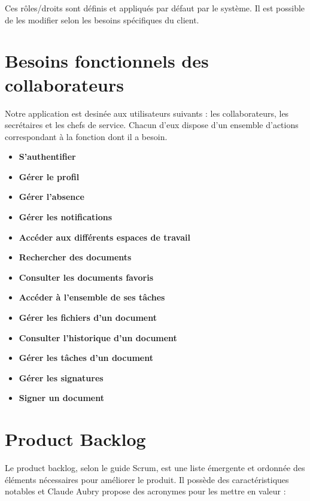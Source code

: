 \begin{small}
  Ces rôles/droits sont définis et appliqués par défaut par le système. Il est possible de les modifier selon les besoins spécifiques du client.
\end{small}


\section{Besoins fonctionnels des collaborateurs}
Notre application est desinée aux utilisateurs suivants : les collaborateurs, les secrétaires et les chefs de service. Chacun d'eux dispose d'un ensemble d'actions correspondant à la fonction dont il a besoin.

\begin{itemize}

\item \textbf{S'authentifier} 
\item \textbf{Gérer le profil}
\item \textbf{Gérer l'absence}
\item \textbf{Gérer les notifications}
\item \textbf{Accéder aux différents espaces de travail}
\item \textbf{Rechercher des documents}
\item \textbf{Consulter les documents favoris}
\item \textbf{Accéder à l'ensemble de ses tâches}
\item \textbf{Gérer les fichiers d'un document}
\item \textbf{Consulter l'historique d'un document}
\item \textbf{Gérer les tâches d'un document}
\item \textbf{Gérer les signatures}
\item \textbf{Signer un document}
\end{itemize}


\section{Product Backlog}
Le product backlog, selon le guide Scrum, est une liste émergente et ordonnée des éléments nécessaires pour améliorer le produit\cite{productBacklog}. Il possède des caractéristiques notables et Claude Aubry propose des acronymes pour les mettre en valeur\cite{caracteristiquesProductBacklog} :


